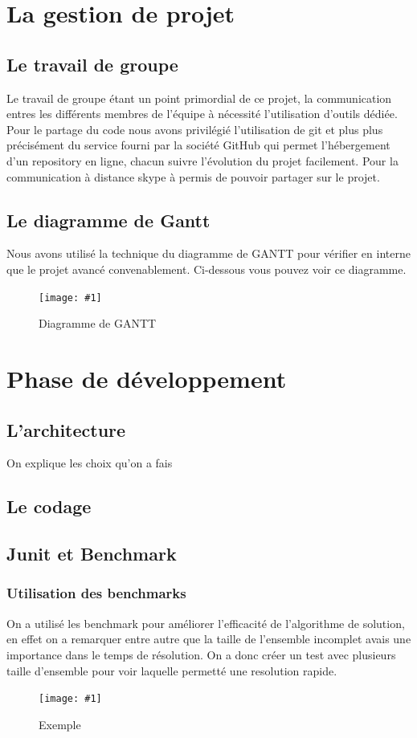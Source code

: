 \documentclass[a4paper,twoside,12pt]{report}
\newcommand{\monimage}[3]{
\par\noindent
\begin{figure}[H] %
\begin{center}
\texttt{[image: \#1]} %
\caption{#2} %
\label{#3} %
\end{center}
\end{figure} %
}
\begin{document}
\chapter{La gestion de projet}
%
\section{Le travail de groupe}
%
Le travail de groupe étant un point primordial de ce projet, la communication entres les différents membres de l'équipe
à nécessité l'utilisation d'outils dédiée. Pour le partage du code nous avons privilégié l'utilisation de git et plus 
plus précisément du service fourni par la société GitHub qui permet l'hébergement d'un repository en ligne, chacun
suivre l'évolution du projet facilement. Pour la communication à distance skype à permis de pouvoir partager sur le
projet.
\section{Le diagramme de Gantt}
%
Nous avons utilisé la technique du diagramme de GANTT pour vérifier en interne que le projet avancé convenablement. Ci-dessous vous pouvez voir ce
diagramme.
\monimage{DiagrammeDeGantt.pdf}{Diagramme de GANTT}{DG}
\chapter{Phase de développement}
%
\section{L'architecture}
On explique les choix qu'on a fais
\section{Le codage}
%
\section{Junit et Benchmark}
%
\subsection{Utilisation des benchmarks}
On a utilisé les benchmark pour améliorer l'efficacité de l'algorithme de solution, en effet on a remarquer entre autre que la taille de l'ensemble
incomplet avais une importance dans le temps de résolution. On a donc créer un test avec plusieurs taille d'ensemble pour voir laquelle 
permetté une resolution rapide.
\monimage{ensembleincomplettest2.pdf}{Exemple}{EX}
\end{document}
